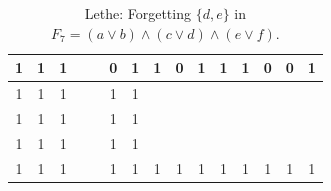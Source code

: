 \begin{table}[!tb]
\begin{tabular}{|c|c|c|c|c|c|c|c|c|c|c|c|c|c|c|}
        \rowcolor{yellow!40} 1 & 1 & 1 &  &  & 0 & 1 & 1 & 0 & 1 & 1 & 1 & 0 & 0 & 1 \\ \hline
        \rowcolor{gray!40} 1 & 1 & 1 &  &  & 1 & 1 &  &  &  &  &  &  &  &  \\ \hline
        \rowcolor{gray!40} 1 & 1 & 1 &  &  & 1 & 1 &  &  &  &  &  &  &  &  \\ \hline
        \rowcolor{gray!40} 1 & 1 & 1 &  &  & 1 & 1 &  &  &  &  &  &  &  &  \\ \hline
        \rowcolor{gray!40} 1 & 1 & 1 &  &  & 1 & 1 & 1 & 1 & 1 & 1 & 1 & 1 & 1 & 1 \\ \hline
    \end{tabular}
    \caption{Lethe: Forgetting $\{d, e\}$ in $F_{7} = (a \lor b) \land (c \lor d) \land (e \lor f)$.}
    \label{tab:lethe-F7-de}
\end{table}
